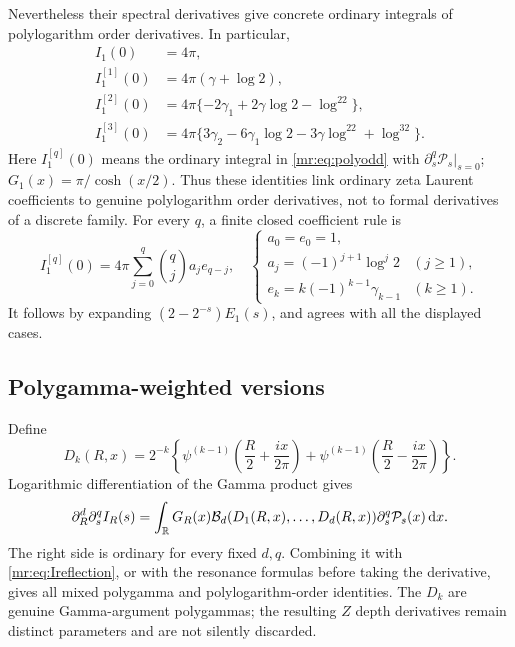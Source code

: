 \documentclass[11pt,letterpaper]{article}
\theoremstyle{definition}\newtheorem{definition}[theorem]{Definition}
\theoremstyle{remark}\newtheorem{remark}[theorem]{Remark}
\newcommand{\dd}{\,\mathrm d}\newcommand{\M}{\mathcal M}
\begin{document}
Nevertheless their spectral derivatives give concrete ordinary integrals
of polylogarithm order derivatives. In particular,
\begin{align}
 I_1(0)&=4\pi,\nonumber\\
 I_1^{[1]}(0)&=4\pi(\gamma+\log2),\label{mr:eq:I1jets}\\
 I_1^{[2]}(0)&=4\pi\{-2\gamma_1+2\gamma\log2-\log^22\},\nonumber\\
 I_1^{[3]}(0)&=4\pi\{3\gamma_2-6\gamma_1\log2
                          -3\gamma\log^22+\log^32\}.\nonumber
\end{align}
Here $I_1^{[q]}(0)$ means the ordinary integral in
\eqref{mr:eq:polyodd} with $\partial_s^q\mathcal P_s|_{s=0}$;
$G_1(x)=\pi/\cosh(x/2)$. Thus these identities link ordinary zeta
Laurent coefficients to genuine polylogarithm order derivatives,
not to formal derivatives of a discrete family.
For every $q$, a finite closed coefficient rule is
\begin{equation}\label{mr:eq:I1all}
 I_1^{[q]}(0)=4\pi\sum_{j=0}^q\binom qj a_j e_{q-j},\quad
 \begin{cases}
 a_0=e_0=1,\\
 a_j=(-1)^{j+1}\log^j2 &(j\ge1),\\
 e_k=k(-1)^{k-1}\gamma_{k-1} &(k\ge1).
 \end{cases}
\end{equation}
It follows by expanding $(2-2^{-s})E_1(s)$, and agrees with all the
displayed cases.

\subsection{Polygamma-weighted versions}
Define
\begin{equation}\label{mr:eq:depthweights}
 D_k(R,x)=2^{-k}\left\{
 \psi^{(k-1)}\left(\frac R2+\frac{ix}{2\pi}\right)
 +\psi^{(k-1)}\left(\frac R2-\frac{ix}{2\pi}\right)\right\}.
\end{equation}
Logarithmic differentiation of the Gamma product gives
\begin{equation}\label{mr:eq:depthjet}
 \partial_R^d\partial_s^q I_R(s)=
 \int_\R G_R(x)\B_d(D_1(R,x),\ldots,D_d(R,x))
                   \partial_s^q\mathcal P_s(x)\dd x.
\end{equation}
The right side is ordinary for every fixed $d,q$.
Combining it with \eqref{mr:eq:Ireflection}, or with the resonance
formulas before taking the derivative, gives all mixed polygamma and
polylogarithm-order identities. The $D_k$ are genuine Gamma-argument
polygammas; the resulting $Z$ depth derivatives remain distinct
parameters and are not silently discarded.
\end{document}
